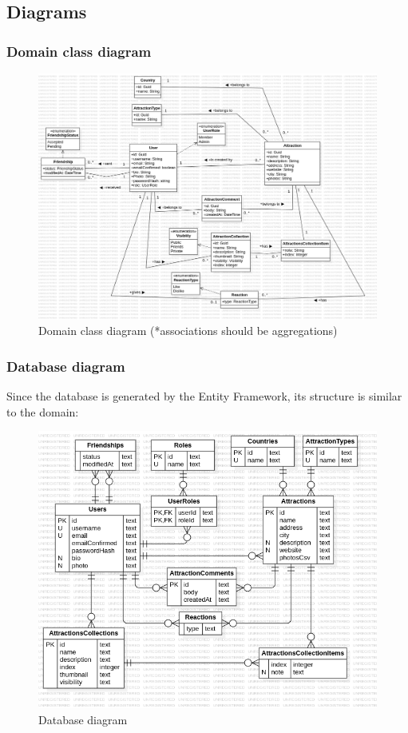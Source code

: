 \subsection{Diagrams}

\subsubsection{Domain class diagram}

\begin{figure}[!ht]
    \centering
    \includegraphics[width=1\linewidth]{domain-class-diagram.png}
    \caption{Domain class diagram (*associations should be aggregations)}
    \label{fig:enter-label}
\end{figure}

\subsubsection{Database diagram}

\par Since the database is generated by the Entity Framework, its structure is similar to the domain:

\clearpage %

\begin{figure}[!ht]
    \centering
    \includegraphics[width=0.7\linewidth]{db-diagram.png}
    \caption{Database diagram}
    \label{fig:enter-label}
\end{figure}


